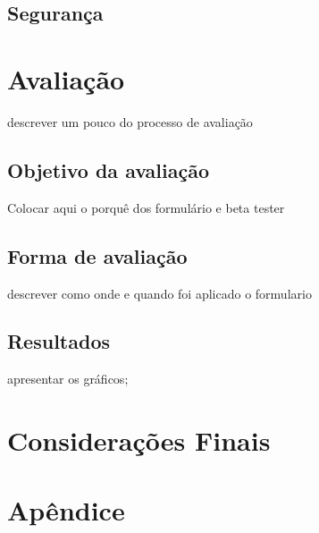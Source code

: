 \documentclass[12pt, a4paper]{report}
\begin{document}
\section{ Segurança}



\chapter{Avaliação}
\par descrever um pouco do processo de avaliação
\section{Objetivo da avaliação }
\par  Colocar aqui o porquê dos formulário e beta tester
\section{Forma de avaliação }
\par descrever como onde e quando foi aplicado o formulario
\section{Resultados } 
\par apresentar os gráficos;
\chapter{Considerações Finais}


\renewcommand\bibname{Referências}

%
%

\nocite{*}


\appendix
\chapter{Apêndice}

\label{whatever}
\end{document}
